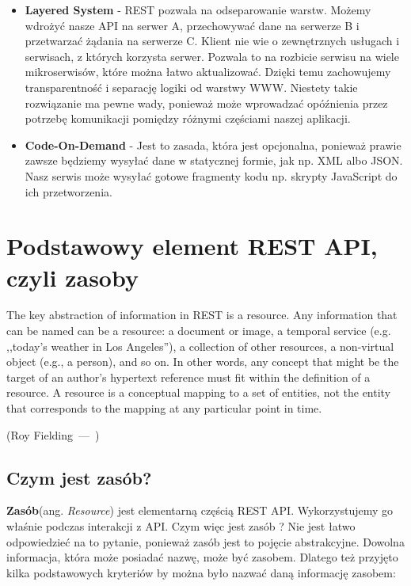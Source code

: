 \documentclass[oneside,polski,logo,indent]{amuthesis}
\let\oldquote\quote
\let\endoldquote\endquote
\renewenvironment{quote}[2][]
  {\if\relax\detokenize{#1}\relax
     \def\quoteauthor{#2}%
   \else
     \def\quoteauthor{#2~---~#1}%
   \fi
   \oldquote}
  {\par\nobreak\smallskip\hfill(\quoteauthor)%
   \endoldquote\addvspace{\bigskipamount}}
\begin{document}
\begin{itemize}
\item \textbf{Layered System} - REST pozwala na odseparowanie warstw. Możemy wdrożyć nasze API na serwer A, przechowywać dane na serwerze B i przetwarzać żądania na serwerze C. Klient nie wie o zewnętrznych usługach i serwisach, z których korzysta serwer. Pozwala to na rozbicie serwisu na wiele mikroserwisów, które można łatwo aktualizować. Dzięki temu zachowujemy transparentność i separację logiki od warstwy WWW. Niestety takie rozwiązanie ma pewne wady, ponieważ może wprowadzać opóźnienia przez potrzebę komunikacji pomiędzy różnymi częściami naszej aplikacji.\newline

\item \textbf{Code-On-Demand} - Jest to zasada, która jest opcjonalna, ponieważ prawie zawsze będziemy wysyłać dane w statycznej formie, jak np. XML albo JSON. Nasz serwis może wysyłać gotowe fragmenty kodu np. skrypty JavaScript do ich przetworzenia. 
\end{itemize}

\section{Podstawowy element REST API, czyli zasoby}

\begin{quote}{Roy Fielding}
The key abstraction of information in REST is a resource. Any information that can be named can be a resource: a document or image, a temporal service (e.g. ,,today’s weather in Los Angeles''), a collection of other resources, a non-virtual object (e.g., a person), and so on. In other words, any concept that might be the target of an author’s hypertext reference must fit within the definition of a resource. A resource is a conceptual mapping to a set of entities, not the entity that corresponds to the mapping at any particular point in time.
\end{quote}

\begin{center}
\subsection{Czym jest zasób?}
\end{center}

\textbf{Zasób}(ang. \emph{Resource}) jest elementarną częścią REST API. Wykorzystujemy go właśnie podczas interakcji z API. Czym więc jest zasób ? Nie jest łatwo odpowiedzieć na to pytanie, ponieważ zasób jest to pojęcie abstrakcyjne. Dowolna informacja, która może posiadać nazwę, może być zasobem. Dlatego też przyjęto kilka podstawowych kryteriów by można było nazwać daną informację zasobem:\newline
\end{document}
